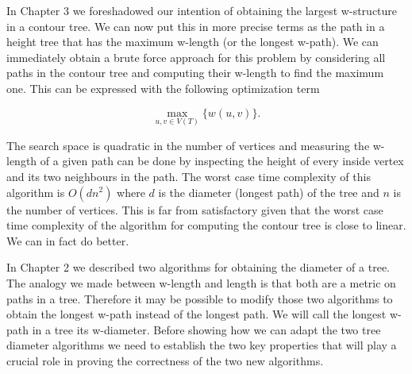 In Chapter 3 we foreshadowed our intention of obtaining the largest w-structure in a contour tree. We can now put this in more precise terms as the path in a height tree that has the maximum w-length (or the longest w-path). We can immediately obtain a brute force approach for this problem by considering all paths in the contour tree and computing their w-length to find the maximum one. This can be expressed with the following optimization term

\begin{equation}
    \label{eq:brute-force}
    \max_{u, v \in V(T)}\{ w(u, v) \} .
\end{equation}

The search space is quadratic in the number of vertices and measuring the w-length of a given path can be done by inspecting the height of every inside vertex and its two neighbours in the path. The worst case time complexity of this algorithm is $O(dn^2)$ where $d$ is the diameter (longest path) of the tree and $n$ is the number of vertices. This is far from satisfactory given that the worst case time complexity of the algorithm for computing the contour tree is close to linear. We can in fact do better.

In Chapter 2 we described two algorithms for obtaining the diameter of a tree. The analogy we made between w-length and length is that both are a metric on paths in a tree. Therefore it may be possible to modify those two algorithms to obtain the longest w-path instead of the longest path. We will call the longest w-path in a tree its w-diameter. Before showing how we can adapt the two tree diameter algorithms we need to establish the two key properties that will play a crucial role in proving the correctness of the two new algorithms.



